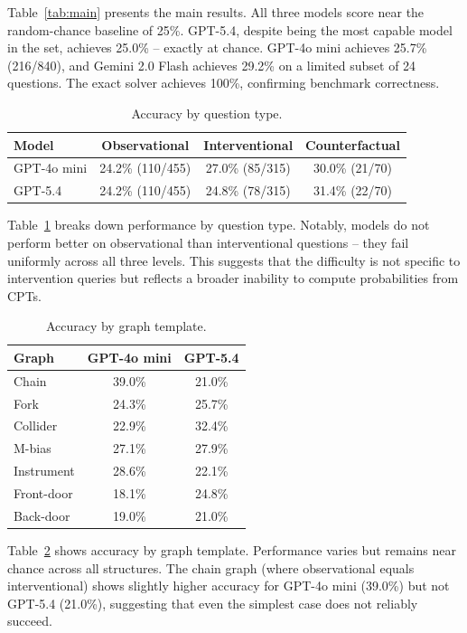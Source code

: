 \documentclass[11pt,a4paper]{article}
\begin{document}
Table~\ref{tab:main} presents the main results. All three models score near the random-chance baseline of 25\%. GPT-5.4, despite being the most capable model in the set, achieves 25.0\% -- exactly at chance. GPT-4o mini achieves 25.7\% (216/840), and Gemini 2.0 Flash achieves 29.2\% on a limited subset of 24 questions. The exact solver achieves 100\%, confirming benchmark correctness.

\begin{table}[h]
\centering
\caption{Accuracy by question type.}
\label{tab:bykind}
\begin{tabular}{lccc}
\toprule
\textbf{Model} & \textbf{Observational} & \textbf{Interventional} & \textbf{Counterfactual} \\
\midrule
GPT-4o mini & 24.2\% (110/455) & 27.0\% (85/315) & 30.0\% (21/70) \\
GPT-5.4 & 24.2\% (110/455) & 24.8\% (78/315) & 31.4\% (22/70) \\
\bottomrule
\end{tabular}
\end{table}

Table~\ref{tab:bykind} breaks down performance by question type. Notably, models do not perform better on observational than interventional questions -- they fail uniformly across all three levels. This suggests that the difficulty is not specific to intervention queries but reflects a broader inability to compute probabilities from CPTs.

\begin{table}[h]
\centering
\caption{Accuracy by graph template.}
\label{tab:bygraph}
\begin{tabular}{lcc}
\toprule
\textbf{Graph} & \textbf{GPT-4o mini} & \textbf{GPT-5.4} \\
\midrule
Chain & 39.0\% & 21.0\% \\
Fork & 24.3\% & 25.7\% \\
Collider & 22.9\% & 32.4\% \\
M-bias & 27.1\% & 27.9\% \\
Instrument & 28.6\% & 22.1\% \\
Front-door & 18.1\% & 24.8\% \\
Back-door & 19.0\% & 21.0\% \\
\bottomrule
\end{tabular}
\end{table}

Table~\ref{tab:bygraph} shows accuracy by graph template. Performance varies but remains near chance across all structures. The chain graph (where observational equals interventional) shows slightly higher accuracy for GPT-4o mini (39.0\%) but not GPT-5.4 (21.0\%), suggesting that even the simplest case does not reliably succeed.
\end{document}
